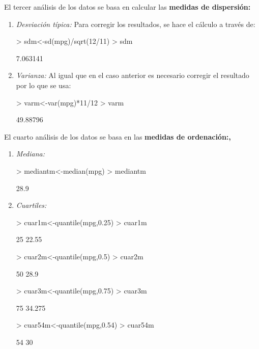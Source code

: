 \documentclass [a4paper] {article}
\begin{document}
\bigskip
El tercer an\'alisis de los datos se basa en calcular las \textbf{medidas de dispersi\'on:}
\begin{enumerate}
\item
\textit{Desviaci\'on t\'ipica: }Para corregir los resultados, se hace el c\'alculo
a trav\'es de:
\begin{Schunk}
\begin{Sinput}
> sdm<-sd(mpg)/sqrt(12/11)
> sdm
\end{Sinput}
\begin{Soutput}
[1] 7.063141
\end{Soutput}
\end{Schunk}

\item
\textit{Varianza: }Al igual que en el caso anterior es necesario corregir el 
resultado por lo que se usa:
\begin{Schunk}
\begin{Sinput}
> varm<-var(mpg)*11/12
> varm
\end{Sinput}
\begin{Soutput}
[1] 49.88796
\end{Soutput}
\end{Schunk}
\end{enumerate}

\bigskip
El cuarto an\'alisis de los datos se basa en las \textbf{medidas de ordenaci\'on:,}
\bigskip

\begin{enumerate}
\item
\textit{Mediana:}
\begin{Schunk}
\begin{Sinput}
> mediantm<-median(mpg)
> mediantm
\end{Sinput}
\begin{Soutput}
[1] 28.9
\end{Soutput}
\end{Schunk}

\item
\textit{Cuartiles:}
\begin{Schunk}
\begin{Sinput}
> cuar1m<-quantile(mpg,0.25)
> cuar1m
\end{Sinput}
\begin{Soutput}
  25%
22.55 
\end{Soutput}
\begin{Sinput}
> cuar2m<-quantile(mpg,0.5)
> cuar2m
\end{Sinput}
\begin{Soutput}
 50%
28.9 
\end{Soutput}
\begin{Sinput}
> cuar3m<-quantile(mpg,0.75)
> cuar3m
\end{Sinput}
\begin{Soutput}
   75%
34.275 
\end{Soutput}
\begin{Sinput}
> cuar54m<-quantile(mpg,0.54)
> cuar54m
\end{Sinput}
\begin{Soutput}
54%
 30 
\end{Soutput}
\end{Schunk}
\end{enumerate}
\end{document}
